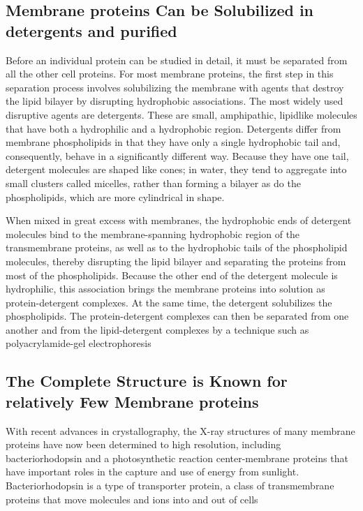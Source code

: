 \subsection{Membrane proteins Can be Solubilized in detergents and purified}

Before an individual protein can be studied in detail, it must be separated
from all the other cell proteins. For most membrane proteins, the first step
in this separation process involves solubilizing the membrane with agents
that destroy the lipid bilayer by disrupting hydrophobic associations. The
most widely used disruptive agents are detergents. These
are small, amphipathic, lipidlike molecules that have both a hydrophilic
and a hydrophobic region. Detergents differ from membrane 
phospholipids in that they have only a single hydrophobic tail and,
consequently, behave in a significantly different way. Because they have
one tail, detergent molecules are shaped like cones; in water, they tend to
aggregate into small clusters called micelles, rather than forming a bilayer
as do the phospholipids, which are more cylindrical in shape.

When mixed in great excess with membranes, the hydrophobic ends of
detergent molecules bind to the membrane-spanning hydrophobic region
of the transmembrane proteins, as well as to the hydrophobic tails of the
phospholipid molecules, thereby disrupting the lipid bilayer and separating 
the proteins from most of the phospholipids. Because the other
end of the detergent molecule is hydrophilic, this association brings the
membrane proteins into solution as protein-detergent complexes.
At the same time, the detergent solubilizes the phospholipids. The
protein-detergent complexes can then be separated from one another
and from the lipid-detergent complexes by a technique such as polyacrylamide-gel 
electrophoresis

\subsection{The Complete Structure is Known for relatively Few Membrane proteins}

With recent advances in crystallography, the X-ray structures of many membrane 
proteins have now been determined to high resolution, including
bacteriorhodopsin and a photosynthetic reaction center-membrane proteins 
that have important roles in the capture and use of energy from sunlight.
Bacteriorhodopsin is a type of transporter protein, a class of
transmembrane proteins that move molecules and ions into and out of
cells

